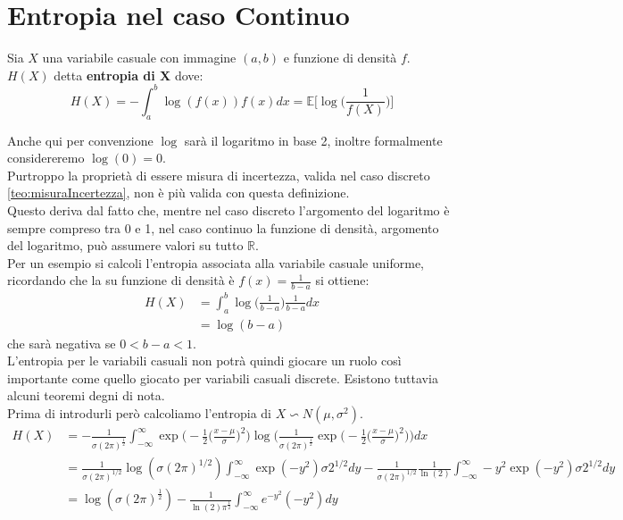 \section{Entropia nel caso Continuo}
\label{sec:EntropiaContinuo}
\begin{defi}
Sia $X$ una variabile casuale con immagine $(a,b)$ e funzione di densità $f$. $H(X)$ detta \textbf{entropia di X} dove:
$$H(X)=-\int_a^b \log(f(x))f(x)dx= \mathbb{E}\bigg[ \log \bigg( \frac{1}{f(X)} \bigg) \bigg]$$
\end{defi}
Anche qui per convenzione $\log$ sarà il logaritmo in base 2, inoltre formalmente considereremo $\log(0)=0$. \\
Purtroppo la proprietà di essere misura di incertezza, valida nel caso discreto \ref{teo:misuraIncertezza}, non è più valida con questa definizione.\\
Questo deriva dal fatto che, mentre nel caso discreto l'argomento del logaritmo è sempre compreso tra 0 e 1, nel caso continuo la funzione di densità, argomento del logaritmo, può assumere valori su tutto $\mathbb{R}$.\\
Per un esempio si calcoli l'entropia associata alla variabile casuale uniforme, ricordando che la su  funzione di densità è $f(x)=\frac{1}{b-a}$ si ottiene:
\[
\begin{split}
H(X)& = \int_a^b \log \bigg( \frac{1}{b-a} \bigg) \frac{1}{b-a} dx \\
& =\log(b-a)
\end{split}
\]
che sarà negativa se $0 < b-a < 1$.\\
L'entropia per le variabili casuali non potrà quindi giocare un ruolo così importante come quello giocato per variabili casuali discrete. Esistono tuttavia alcuni teoremi degni di nota.\\
Prima di introdurli però calcoliamo l'entropia di $X \backsim N(\mu, \sigma^2)$.
\[
\begin{split}
H(X)& = - \frac{1}{\sigma (2 \pi)^{\frac{1}{2}}} \int_{-\infty}^{\infty} \exp \bigg(- \frac{1}{2} \bigg( \frac{x-\mu}{\sigma} \bigg)^2 \bigg) \log \bigg( \frac{1}{\sigma (2\pi)^{\frac{1}{2}}} \exp \bigg( - \frac{1}{2} \bigg( \frac{x-\mu}{ \sigma} \bigg)^2 \bigg)  \bigg) dx  \\ 
&=\frac{1}{\sigma(2 \pi )^{1/2}} \log (\sigma(2 \pi )^{1/2}) \int_{-\infty}^{\infty} \exp ( -y^2 ) \sigma 2^{1/2} dy - \frac{1}{\sigma (2 \pi)^{1/2}} \frac{1}{\ln (2)}   \int_{-\infty}^{\infty} -y^2 \exp (-y^2) \sigma 2^{1/2} dy \\
& = \log (\sigma (2 \pi)^{\frac{1}{2}})- \frac{1}{\ln(2) \pi^{\frac{1}{2}}}\int_{-\infty}^{\infty} e^{-y^2}(-y^2) dy
\end{split}
\]
